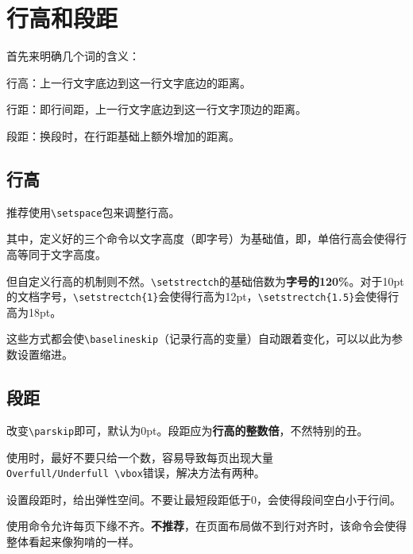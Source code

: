 \documentclass[10pt,openany]{book}
\begin{document}
\begin{sloppypar}
\section{行高和段距}

首先来明确几个词的含义：

行高：上一行文字底边到这一行文字底边的距离。

行距：即行间距，上一行文字底边到这一行文字顶边的距离。

段距：换段时，在行距基础上额外增加的距离。

\subsection{行高}

推荐使用\texttt{\textbackslash{}setspace}包来调整行高。



其中，定义好的三个命令以文字高度（即字号）为基础值，即，单倍行高会使得行高等同于文字高度。

但自定义行高的机制则不然。\texttt{\textbackslash{}setstrectch}的基础倍数为\textbf{字号的120\%}。对于10pt的文档字号，\texttt{\textbackslash{}setstrectch\{1\}}会使得行高为12pt，\texttt{\textbackslash{}setstrectch\{1.5\}}会使得行高为18pt。

这些方式都会使\texttt{\textbackslash{}baselineskip}（记录行高的变量）自动跟着变化，可以以此为参数设置缩进。

\subsection{段距}

改变\texttt{\textbackslash{}parskip}即可，默认为0pt。段距应为\textbf{行高的整数倍}，不然特别的丑。



使用时，最好不要只给一个数，容易导致每页出现大量\texttt{Overfull/Underfull\ \textbackslash{}vbox}错误，解决方法有两种。

\begin{tightenum}
    \item   设置段距时，给出弹性空间。不要让最短段距低于0，会使得段间空白小于行间。
    \item   使用命令允许每页下缘不齐。\textbf{不推荐}，在页面布局做不到行对齐时，该命令会使得整体看起来像狗啃的一样。
\end{tightenum}


\end{sloppypar}
\end{document}
